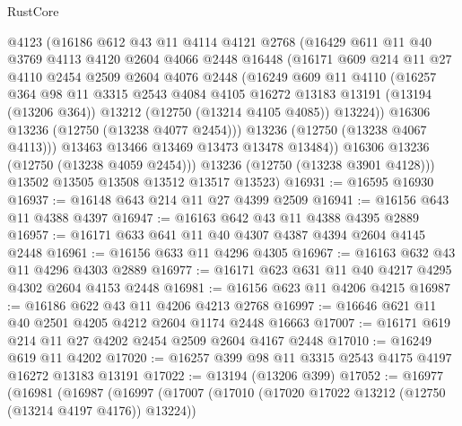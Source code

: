 \begin{lexlean}{RustCore}
\begin{coremodule}
            @4123
            (@16186
              @612
              @43
              @11
              @4114
              @4121
              @2768
              (@16429
                @611
                @11
                @40
                @3769
                @4113
                @4120
                @2604
                @4066
                @2448
                @16448
                (@16171
                  @609
                  @214
                  @11
                  @27
                  @4110
                  @2454
                  @2509
                  @2604
                  @4076
                  @2448
                  (@16249
                    @609
                    @11
                    @4110
                    (@16257
                      @364
                      @98
                      @11
                      @3315
                      @2543
                      @4084
                      @4105
                      @16272
                      @13183
                      @13191
                      (@13194 (@13206 @364))
                      @13212
                      (@12750 (@13214 @4105 @4085))
                      @13224))
                  @16306
                  @13236
                  (@12750 (@13238 @4077 @2454)))
                @13236
                (@12750 (@13238 @4067 @4113)))
              @13463
              @13466
              @13469
              @13473
              @13478
              @13484))
          @16306
          @13236
          (@12750 (@13238 @4059 @2454)))
        @13236
        (@12750 (@13238 @3901 @4128)))
      @13502
      @13505
      @13508
      @13512
      @13517
      @13523)
@16931 := @16595 @16930
@16937 := @16148 @643 @214 @11 @27 @4399 @2509
@16941 := @16156 @643 @11 @4388 @4397
@16947 := @16163 @642 @43 @11 @4388 @4395 @2889
@16957 := @16171 @633 @641 @11 @40 @4307 @4387 @4394 @2604 @4145 @2448
@16961 := @16156 @633 @11 @4296 @4305
@16967 := @16163 @632 @43 @11 @4296 @4303 @2889
@16977 := @16171 @623 @631 @11 @40 @4217 @4295 @4302 @2604 @4153 @2448
@16981 := @16156 @623 @11 @4206 @4215
@16987 := @16186 @622 @43 @11 @4206 @4213 @2768
@16997 := @16646 @621 @11 @40 @2501 @4205 @4212 @2604 @1174 @2448 @16663
@17007 := @16171 @619 @214 @11 @27 @4202 @2454 @2509 @2604 @4167 @2448
@17010 := @16249 @619 @11 @4202
@17020 := @16257 @399 @98 @11 @3315 @2543 @4175 @4197 @16272 @13183 @13191
@17022 := @13194 (@13206 @399)
@17052 := @16977
    (@16981
      (@16987
        (@16997
          (@17007
            (@17010 (@17020 @17022 @13212 (@12750 (@13214 @4197 @4176)) @13224))

\end{coremodule}
\end{lexlean}
